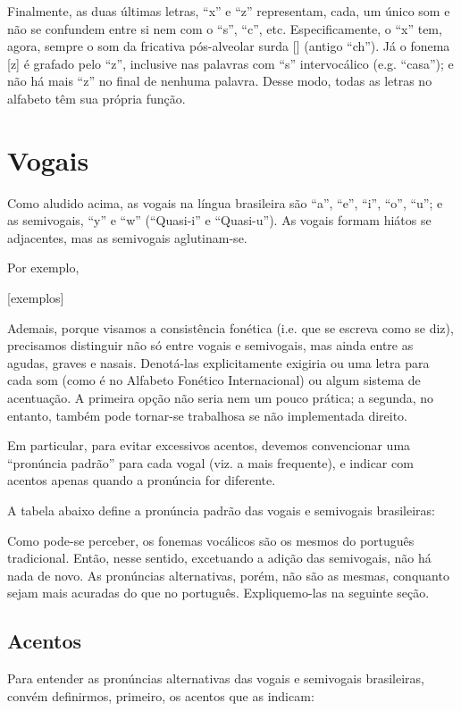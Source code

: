 \documentclass[12pt, a5paper, titlepage]{article}
\begin{document}
\begin{bilingualpages}
    Finalmente, as duas últimas letras, ``x'' e ``z'' representam, cada, um único
    som e não se confundem entre si nem com o ``s'', ``c'', etc. Especificamente, o
    ``x'' tem, agora, sempre o som da fricativa pós-alveolar surda [\textesh]
    (antigo ``ch''). Já o fonema [z] é grafado pelo ``z'', inclusive nas palavras
    com ``s'' intervocálico (e.g. ``casa''); e não há mais ``z'' no final de
    nenhuma palavra. Desse modo, todas as letras no alfabeto têm sua própria
    função.

    \section{Vogais}
    Como aludido acima, as vogais na língua brasileira são ``a'', ``e'', ``i'',
    ``o'', ``u''; e as semivogais, ``y'' e ``w'' (``Quasi-i'' e ``Quasi-u''). As
    vogais formam hiátos se adjacentes, mas as semivogais aglutinam-se.

    Por exemplo,

    [exemplos]

    Ademais, porque visamos a consistência fonética (i.e. que se escreva como se
    diz), precisamos distinguir não só entre vogais e semivogais, mas ainda entre
    as agudas, graves e nasais. Denotá-las explicitamente exigiria ou uma letra
    para cada som (como é no Alfabeto Fonético Internacional) ou algum sistema de
    acentuação. A primeira opção não seria nem um pouco prática; a segunda, no
    entanto, também pode tornar-se trabalhosa se não implementada direito.

    Em particular, para evitar excessivos acentos, devemos convencionar uma
    ``pronúncia padrão'' para cada vogal (viz. a mais frequente), e indicar com
    acentos apenas quando a pronúncia for diferente.

    A tabela abaixo define a pronúncia padrão das vogais e semivogais brasileiras:

    \PtTableVowels

    Como pode-se perceber, os fonemas vocálicos são os mesmos do português
    tradicional. Então, nesse sentido, excetuando a adição das semivogais, não há
    nada de novo. As pronúncias alternativas, porém, não são as mesmas, conquanto
    sejam mais acuradas do que no português. Expliquemo-las na seguinte seção.

    \subsection{Acentos}
    Para entender as pronúncias alternativas das vogais e semivogais brasileiras,
    convém definirmos, primeiro, os acentos que as indicam:


\end{bilingualpages}
\end{document}
